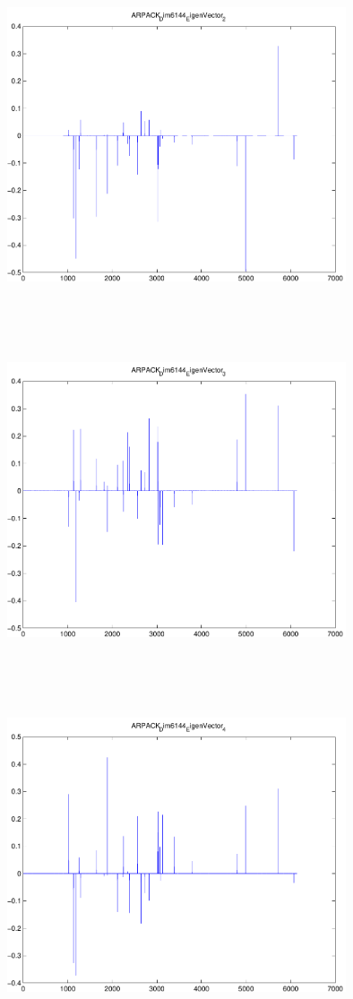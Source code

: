 \documentclass[9pt]{article}
\theoremstyle{plain}
\theoremstyle{definition}
\theoremstyle{remark}
\numberwithin{equation}{section}
\begin{document}
\includegraphics[width=10.0cm,height=10.0cm]{ARPACK_Dim6144_EigenVector_2.pdf}

\includegraphics[width=10.0cm,height=10.0cm]{ARPACK_Dim6144_EigenVector_3.pdf}

\includegraphics[width=10.0cm,height=10.0cm]{ARPACK_Dim6144_EigenVector_4.pdf}
\end{document}
